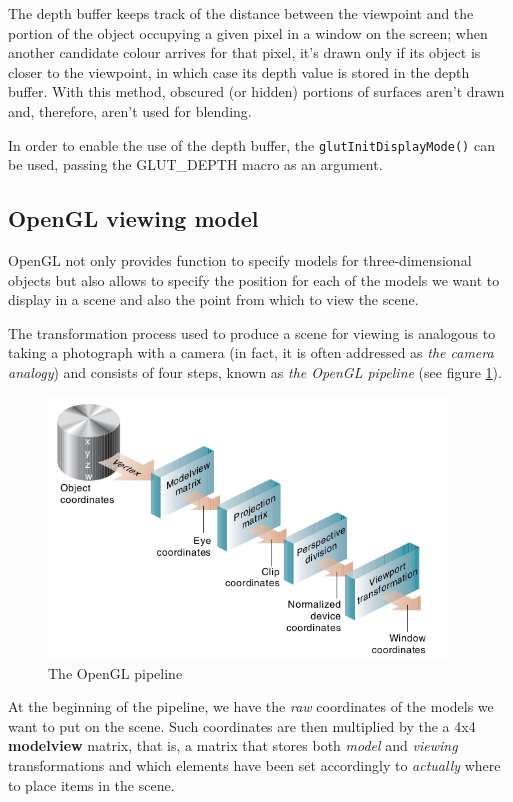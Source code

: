 %
The depth buffer keeps track of the distance between the viewpoint and 
the portion of the object occupying a given pixel in a window on the 
screen; when another candidate colour arrives for that pixel, it's drawn 
only if its object is closer to the viewpoint, in which case its depth
value is stored in the depth buffer. With this method, obscured (or hidden)
portions of surfaces aren't drawn and, therefore, aren't used for
blending.
%

%
In order to enable the use of the depth buffer, the 
\texttt{glutInitDisplayMode()} can be used, passing the 
GLUT\_DEPTH macro as an argument.
%

\subsection{OpenGL viewing model}
OpenGL not only provides function to specify models for 
three-dimensional objects but also allows to specify the 
position for each of the models we want to display in a 
scene and also the point from which to view the scene.
%

%
The transformation process used to produce a scene for viewing 
is analogous to taking a photograph with a camera (in fact, it 
is often addressed as \textit{the camera analogy}\cite{opengl:cameraanalogy}) 
and consists of four steps, known as 
\textit{the OpenGL pipeline} (see figure \ref{fig:openglpipe}).
%
\begin{figure}[!h]
  \begin{center}
    \includegraphics[width=300pt]{img/openGLpipe.png}
    \caption{The OpenGL pipeline}
    \label{fig:openglpipe}
  \end{center}
\end{figure}
%
At the beginning of the pipeline, we have the \textit{raw} 
coordinates of the models we want to put on the scene. Such 
coordinates are then multiplied by the a 4x4 \textbf{modelview} 
matrix, that is, a matrix that stores both \textit{model} and 
\textit{viewing} transformations and which elements have been set 
accordingly to \textit{actually} where to place items in the scene.
%

